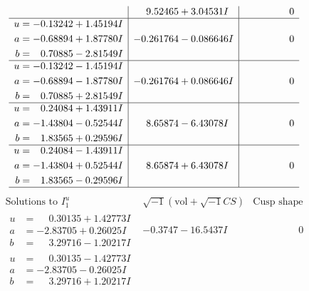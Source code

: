 \documentclass[1p]{elsarticle_modified}
\theoremstyle{definition}
\newcommand{\I}{\sqrt{-1}}
\begin{document}
$$\begin{array}{c|c|c}
 & \phantom{-}9.52465 + 3.04531 I & \phantom{-0.000000 } 0 \\ \hline\begin{aligned}
u &= -0.13242 + 1.45194 I \\
a &= -0.68894 + 1.87780 I \\
b &= \phantom{-}0.70885 - 2.81549 I\end{aligned}
 & -0.261764 - 0.086646 I & \phantom{-0.000000 } 0 \\ \hline\begin{aligned}
u &= -0.13242 - 1.45194 I \\
a &= -0.68894 - 1.87780 I \\
b &= \phantom{-}0.70885 + 2.81549 I\end{aligned}
 & -0.261764 + 0.086646 I & \phantom{-0.000000 } 0 \\ \hline\begin{aligned}
u &= \phantom{-}0.24084 + 1.43911 I \\
a &= -1.43804 - 0.52544 I \\
b &= \phantom{-}1.83565 + 0.29596 I\end{aligned}
 & \phantom{-}8.65874 - 6.43078 I & \phantom{-0.000000 } 0 \\ \hline\begin{aligned}
u &= \phantom{-}0.24084 - 1.43911 I \\
a &= -1.43804 + 0.52544 I \\
b &= \phantom{-}1.83565 - 0.29596 I\end{aligned}
 & \phantom{-}8.65874 + 6.43078 I & \phantom{-0.000000 } 0\\
 \hline 
 \end{array}$$\newpage$$\begin{array}{c|c|c}  
\text{Solutions to }I^u_{1}& \I (\text{vol} + \sqrt{-1}CS) & \text{Cusp shape}\\
 \hline 
\begin{aligned}
u &= \phantom{-}0.30135 + 1.42773 I \\
a &= -2.83705 + 0.26025 I \\
b &= \phantom{-}3.29716 - 1.20217 I\end{aligned}
 & -0.3747 - 16.5437 I & \phantom{-0.000000 } 0 \\ \hline\begin{aligned}
u &= \phantom{-}0.30135 - 1.42773 I \\
a &= -2.83705 - 0.26025 I \\
b &= \phantom{-}3.29716 + 1.20217 I\end{aligned}

\end{array}$$
\end{document}
